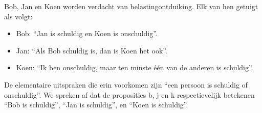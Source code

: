 \documentclass[dutch]{../khlslides}
\begin{document}
\begin{frame}
  Bob, Jan en Koen worden verdacht van belastingontduiking. Elk
  van hen getuigt als volgt:
  \begin{itemize}
  \item Bob: ``Jan is schuldig en Koen is onschuldig''.
  \item Jan: ``Als Bob schuldig is, dan is Koen het ook''.
  \item Koen: ``Ik ben onschuldig, maar ten minste \'e\'en van de anderen is schuldig''.
  \end{itemize}
  De elementaire uitspraken die erin voorkomen zijn ``een persoon is schuldig of
  onschuldig''. We spreken af dat de proposities b, j en k respectievelijk betekenen
  ``Bob is schuldig'', ``Jan is schuldig'', en ``Koen is schuldig''.
\end{frame}
\end{document}
